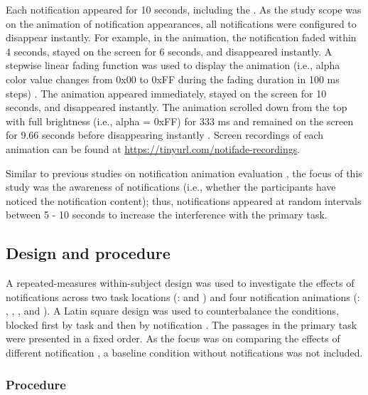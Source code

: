 Each notification appeared for 10 seconds, including the \fadeduration{} \cite{maglio_tradeoffs_2000, mccrickard_evaluating_2001, android_android_2021}. As the study scope was on the animation of notification appearances, all notifications were configured to disappear instantly. For example, in the \slowfade{} animation, the notification faded within 4 seconds, stayed on the screen for 6 seconds, and disappeared instantly. A stepwise linear fading function was used to display the \fading{} animation (i.e., alpha color value changes from 0x00 to 0xFF during the fading duration in 100 ms steps) \cite{maglio_tradeoffs_2000, mccrickard_evaluating_2001}. The \instant{} animation appeared immediately, stayed on the screen for 10 seconds, and disappeared instantly. The \scroll{} animation scrolled down from the top with full brightness (i.e., alpha = 0xFF) for 333 ms and remained on the screen for 9.66 seconds before disappearing instantly \cite{maglio_tradeoffs_2000, android_android_2021}.
Screen recordings of each animation can be found at \url{https://tinyurl.com/notifade-recordings}.

Similar to previous studies on notification animation evaluation \cite{mccrickard_establishing_2003, mccrickard_evaluating_2001, maglio_tradeoffs_2000}, the focus of this study was the awareness of notifications (i.e., whether the participants have noticed the notification content); thus, notifications appeared at random intervals between 5 - 10 seconds to increase the interference with the primary task.


\subsection{Design and procedure}
\label{sec:GradNotif:study1:design_procedure}

A repeated-measures within-subject design was used to investigate the effects of notifications across two task locations (\location{}: \desktop{} and \glass{}) and four notification animations (\animation{}: \instant{}, \fastfade{}, \slowfade{}, and \scroll{}). A Latin square design was used to counterbalance the conditions, blocked first by task \location{} and then by notification \animation{}. The passages in the primary task were presented in a fixed order. As the focus was on comparing the effects of different notification , a baseline condition without notifications was not included.


\subsubsection*{Procedure}

